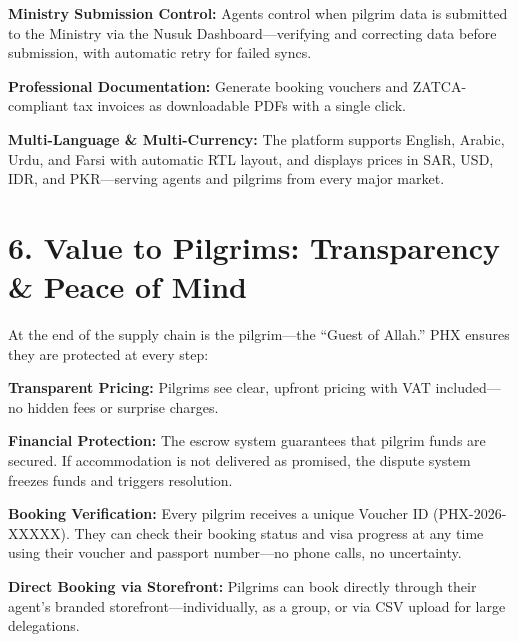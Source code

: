 \documentclass[11pt,a4paper]{article}
\begin{document}
\textbf{Ministry Submission Control:} Agents control when pilgrim data is submitted to the Ministry via the Nusuk Dashboard---verifying and correcting data before submission, with automatic retry for failed syncs.

\vspace{0.3cm}

\textbf{Professional Documentation:} Generate booking vouchers and ZATCA-compliant tax invoices as downloadable PDFs with a single click.

\vspace{0.3cm}

\textbf{Multi-Language \& Multi-Currency:} The platform supports English, Arabic, Urdu, and Farsi with automatic RTL layout, and displays prices in SAR, USD, IDR, and PKR---serving agents and pilgrims from every major market.

\section*{6. Value to Pilgrims: Transparency \& Peace of Mind}


At the end of the supply chain is the pilgrim---the ``Guest of Allah.'' PHX ensures they are protected at every step:


\vspace{0.3cm}

\textbf{Transparent Pricing:} Pilgrims see clear, upfront pricing with VAT included---no hidden fees or surprise charges.

\vspace{0.3cm}

\textbf{Financial Protection:} The escrow system guarantees that pilgrim funds are secured. If accommodation is not delivered as promised, the dispute system freezes funds and triggers resolution.

\vspace{0.3cm}

\textbf{Booking Verification:} Every pilgrim receives a unique Voucher ID (PHX-2026-XXXXX). They can check their booking status and visa progress at any time using their voucher and passport number---no phone calls, no uncertainty.

\vspace{0.3cm}

\textbf{Direct Booking via Storefront:} Pilgrims can book directly through their agent's branded storefront---individually, as a group, or via CSV upload for large delegations.

\vspace{0.3cm}
\end{document}
